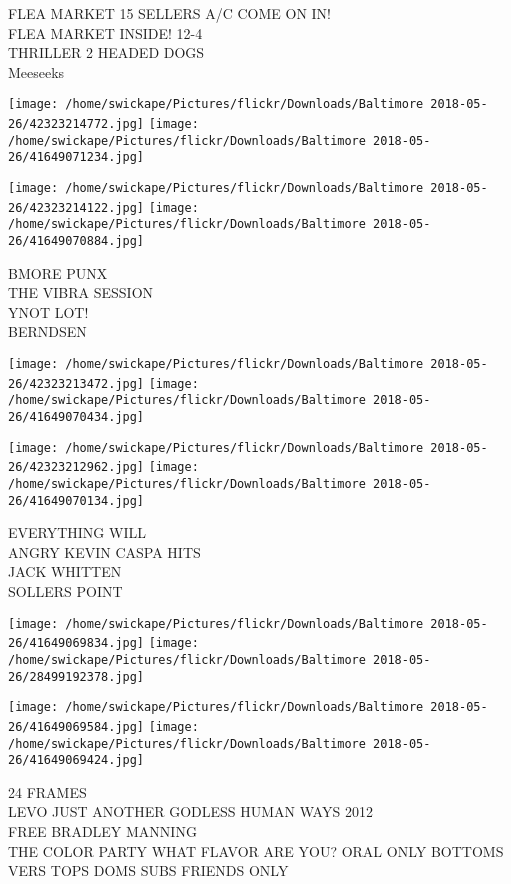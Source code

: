 \documentclass[10pt,letterpaper]{article}
\begin{document}
FLEA MARKET 15 SELLERS A/C COME ON IN!\\
FLEA MARKET INSIDE! 12{-}4\\
THRILLER 2 HEADED DOGS\\
Meeseeks
\pagebreak

\texttt{[image: /home/swickape/Pictures/flickr/Downloads/Baltimore 2018-05-26/42323214772.jpg]}
\texttt{[image: /home/swickape/Pictures/flickr/Downloads/Baltimore 2018-05-26/41649071234.jpg]}

\texttt{[image: /home/swickape/Pictures/flickr/Downloads/Baltimore 2018-05-26/42323214122.jpg]}
\texttt{[image: /home/swickape/Pictures/flickr/Downloads/Baltimore 2018-05-26/41649070884.jpg]}

BMORE PUNX\\
THE VIBRA SESSION\\
YNOT LOT!\\
BERNDSEN
\pagebreak

\texttt{[image: /home/swickape/Pictures/flickr/Downloads/Baltimore 2018-05-26/42323213472.jpg]}
\texttt{[image: /home/swickape/Pictures/flickr/Downloads/Baltimore 2018-05-26/41649070434.jpg]}

\texttt{[image: /home/swickape/Pictures/flickr/Downloads/Baltimore 2018-05-26/42323212962.jpg]}
\texttt{[image: /home/swickape/Pictures/flickr/Downloads/Baltimore 2018-05-26/41649070134.jpg]}

EVERYTHING WILL\\
ANGRY KEVIN CASPA HITS\\
JACK WHITTEN\\
SOLLERS POINT
\pagebreak

\texttt{[image: /home/swickape/Pictures/flickr/Downloads/Baltimore 2018-05-26/41649069834.jpg]}
\texttt{[image: /home/swickape/Pictures/flickr/Downloads/Baltimore 2018-05-26/28499192378.jpg]}

\texttt{[image: /home/swickape/Pictures/flickr/Downloads/Baltimore 2018-05-26/41649069584.jpg]}
\texttt{[image: /home/swickape/Pictures/flickr/Downloads/Baltimore 2018-05-26/41649069424.jpg]}

24 FRAMES\\
LEVO JUST ANOTHER GODLESS HUMAN WAYS 2012\\
FREE BRADLEY MANNING\\
THE COLOR PARTY WHAT FLAVOR ARE YOU?  ORAL ONLY BOTTOMS VERS TOPS DOMS SUBS FRIENDS ONLY
\pagebreak
\end{document}
